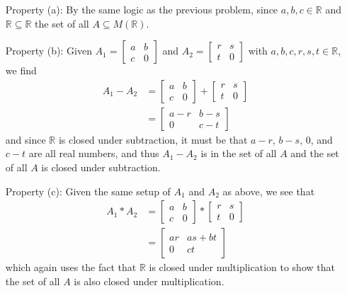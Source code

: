 \documentclass{article}
\begin{document}
\begin{enumerate}
			\begin{enumerate}
				\item [Property (a):] By the same logic as the previous problem, since $a, b, c \in 
					\mathbb{R}$ and $\mathbb{R} \subseteq \mathbb{R}$ the set of all 
					$A \subseteq M(\mathbb{R})$.
				\item [Property (b):] Given $A_1 = \begin{bmatrix} a & b \\ c & 0 \end{bmatrix}$ and 
					$A_2 = \begin{bmatrix} r & s \\ t & 0 \end{bmatrix}$ with $a, b, c, r, s, t \in
					\mathbb{R}$, we find
					\begin{align*}
						A_1 - A_2 & = \begin{bmatrix} a & b \\ c & 0 \end{bmatrix} 
									+ \begin{bmatrix} r & s \\ t & 0 \end{bmatrix} \\
								  & = \begin{bmatrix} a - r & b - s \\ 0 & c - t \end{bmatrix} 
					\end{align*}
					and since $\mathbb{R}$ is closed under subtraction, it must be that $a - r$, 
					$b - s$, $0$, and $c - t$ are all real numbers, and thus $A_1 - A_2$ is in the 
					set of all $A$ and the set of all $A$ is closed under subtraction. 
				\item [Property (c):] Given the same setup of $A_1$ and $A_2$ as above, we see that
					\begin{align*}
						A_1 * A_2 & = \begin{bmatrix} a & b \\ c & 0 \end{bmatrix} 
									* \begin{bmatrix} r & s \\ t & 0 \end{bmatrix} \\
								  & = \begin{bmatrix} ar & as + bt \\ 0 & ct \end{bmatrix} 
					\end{align*}
					which again uses the fact that $\mathbb{R}$ is closed under multiplication to 
					show that the set of all $A$ is also closed under multiplication.
			\end{enumerate}


\end{enumerate}
\end{document}
